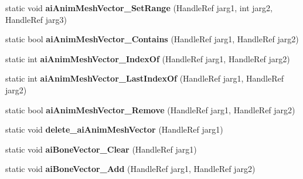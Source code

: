 \begin{DoxyCompactItemize}
\item 
\hypertarget{class_assimp_p_i_n_v_o_k_e_a41b092adb54a7ce5f0e263eb5a6dc81a}{static void {\bfseries ai\+Anim\+Mesh\+Vector\+\_\+\+Set\+Range} (Handle\+Ref jarg1, int jarg2, Handle\+Ref jarg3)}\label{class_assimp_p_i_n_v_o_k_e_a41b092adb54a7ce5f0e263eb5a6dc81a}

\item 
\hypertarget{class_assimp_p_i_n_v_o_k_e_ac598f123ba49abcdaae358be694d0377}{static bool {\bfseries ai\+Anim\+Mesh\+Vector\+\_\+\+Contains} (Handle\+Ref jarg1, Handle\+Ref jarg2)}\label{class_assimp_p_i_n_v_o_k_e_ac598f123ba49abcdaae358be694d0377}

\item 
\hypertarget{class_assimp_p_i_n_v_o_k_e_aeafecbf85c9432631c8571f6e4fdf049}{static int {\bfseries ai\+Anim\+Mesh\+Vector\+\_\+\+Index\+Of} (Handle\+Ref jarg1, Handle\+Ref jarg2)}\label{class_assimp_p_i_n_v_o_k_e_aeafecbf85c9432631c8571f6e4fdf049}

\item 
\hypertarget{class_assimp_p_i_n_v_o_k_e_a19205a90c714b785eb723b931ef032f7}{static int {\bfseries ai\+Anim\+Mesh\+Vector\+\_\+\+Last\+Index\+Of} (Handle\+Ref jarg1, Handle\+Ref jarg2)}\label{class_assimp_p_i_n_v_o_k_e_a19205a90c714b785eb723b931ef032f7}

\item 
\hypertarget{class_assimp_p_i_n_v_o_k_e_acaa878c058b6ecc63210906162f598cf}{static bool {\bfseries ai\+Anim\+Mesh\+Vector\+\_\+\+Remove} (Handle\+Ref jarg1, Handle\+Ref jarg2)}\label{class_assimp_p_i_n_v_o_k_e_acaa878c058b6ecc63210906162f598cf}

\item 
\hypertarget{class_assimp_p_i_n_v_o_k_e_a798abc58425fd156f01941ab22b4e3bf}{static void {\bfseries delete\+\_\+ai\+Anim\+Mesh\+Vector} (Handle\+Ref jarg1)}\label{class_assimp_p_i_n_v_o_k_e_a798abc58425fd156f01941ab22b4e3bf}

\item 
\hypertarget{class_assimp_p_i_n_v_o_k_e_a1aaedb643246ecc5dfd004857b7dd5e8}{static void {\bfseries ai\+Bone\+Vector\+\_\+\+Clear} (Handle\+Ref jarg1)}\label{class_assimp_p_i_n_v_o_k_e_a1aaedb643246ecc5dfd004857b7dd5e8}

\item 
\hypertarget{class_assimp_p_i_n_v_o_k_e_ab7bea8deb01ad0ace95be3a435289ce6}{static void {\bfseries ai\+Bone\+Vector\+\_\+\+Add} (Handle\+Ref jarg1, Handle\+Ref jarg2)}\label{class_assimp_p_i_n_v_o_k_e_ab7bea8deb01ad0ace95be3a435289ce6}


\end{DoxyCompactItemize}

